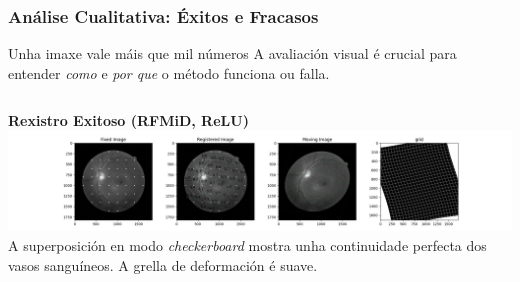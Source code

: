 \documentclass[xcolor=dvipsnames]{beamer}
\begin{document}
\begin{frame}
    \frametitle{Análise Cualitativa: Éxitos e Fracasos}
    
    \begin{block}{Unha imaxe vale máis que mil números}
        A avaliación visual é crucial para entender \textit{como} e \textit{por que} o método funciona ou falla.
    \end{block}
    
    \begin{columns}
        \begin{column}{0.5\textwidth}
            \centering
            \textbf{Rexistro Exitoso (RFMiD, ReLU)}
        \includegraphics[width=\textwidth]{../imaxes/reg_examples/RFMID_MLP_buena.png}
            \vspace{0.2cm}
            A superposición en modo \textit{checkerboard} mostra unha continuidade perfecta dos vasos sanguíneos. A grella de deformación é suave.
        \end{column}
        

\end{columns}
\end{frame}
\end{document}
